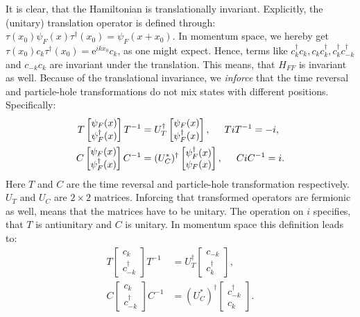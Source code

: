It is clear, that the Hamiltonian is translationally invariant. Explicitly, the (unitary) translation operator is defined through: $\tau(x_0)\psi_F(x)\tau^\dagger (x_0) = \psi_F(x+x_0)$. In momentum space, we hereby get $\tau(x_0) c_k \tau^\dagger(x_0) = \text{e}^{ikx_0}c_k$, as one might expect. Hence, terms like $c^\dagger_k c_k, c_k c^\dagger_k, c^\dagger_kc^\dagger_{-k}$ and $c_{-k}c_k$ are invariant under the translation. This means, that $H_{FF}$ is invariant as well. Because of the translational invariance, we \textit{inforce} that the time reversal and particle-hole transformations do not mix states with different positions. Specifically:
\begin{align}
T \begin{bmatrix} \psi_F(x) \\ \psi^\dagger_F(x) \end{bmatrix} T^{-1} &= U^\dagger_T \begin{bmatrix} \psi_F(x) \\ \psi^\dagger_F(x) \end{bmatrix}, \hspace{0.5cm} TiT^{-1} = -i, \nonumber \\
C \begin{bmatrix} \psi_F(x) \\ \psi^\dagger_F(x) \end{bmatrix} C^{-1} &= (U^*_C)^\dagger \begin{bmatrix} \psi^\dagger_F(x) \\ \psi_F(x) \end{bmatrix}, \hspace{0.5cm} CiC^{-1} = i.  
\label{eq.TRandPH.realspace}
\end{align}
Here $T$ and $C$ are the time reversal and particle-hole transformation respectively. $U_T$ and $U_C$ are $2\times 2$ matrices. Inforcing that transformed operators are fermionic as well, means that the matrices have to be unitary. The operation on $i$ specifies, that $T$ is antiunitary and $C$ is unitary. In momentum space this definition leads to:
\begin{align}
T \begin{bmatrix} c_k \\ c^\dagger_{-k} \end{bmatrix} T^{-1} &= U^\dagger_T \begin{bmatrix} c_{-k} \\ c^\dagger_{k} \end{bmatrix}, \nonumber \\
C \begin{bmatrix} c_k \\ c^\dagger_{-k} \end{bmatrix} C^{-1} &= (U^*_C)^\dagger \begin{bmatrix} c^\dagger_{-k} \\ c_{k} \end{bmatrix}. 
\label{eq.TRandPH.momentumspace}
\end{align}
